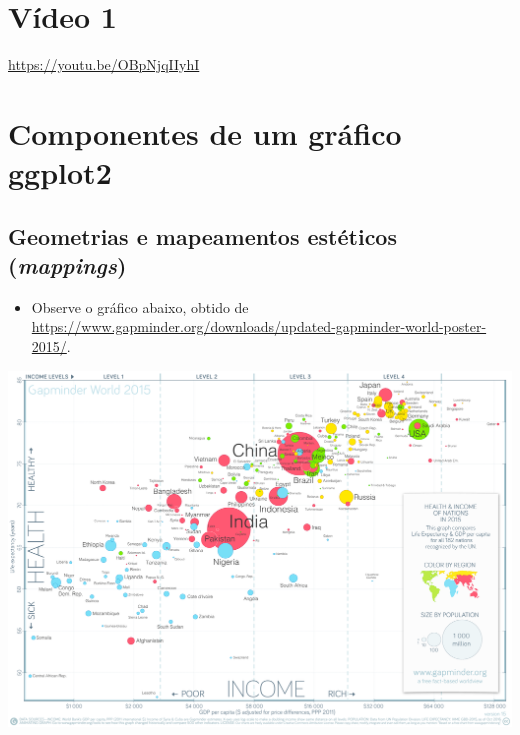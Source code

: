 \documentclass[
  11pt]{report}
\providecommand{\tightlist}{%
  \setlength{\itemsep}{0pt}\setlength{\parskip}{0pt}}
\begin{document}
\hypertarget{vuxeddeo-1-2}{%
\section{Vídeo 1}\label{vuxeddeo-1-2}}

\begin{center} \url{https://youtu.be/OBpNjqIIyhI} \end{center}

\hypertarget{componentes-de-um-gruxe1fico-ggplot2}{%
\section{Componentes de um gráfico ggplot2}\label{componentes-de-um-gruxe1fico-ggplot2}}

\hypertarget{geometrias-e-mapeamentos-estuxe9ticos-mappings}{%
\subsection{\texorpdfstring{Geometrias e mapeamentos estéticos (\emph{mappings})}{Geometrias e mapeamentos estéticos (mappings)}}\label{geometrias-e-mapeamentos-estuxe9ticos-mappings}}

\begin{itemize}
\tightlist
\item
  Observe o gráfico abaixo, obtido de \url{https://www.gapminder.org/downloads/updated-gapminder-world-poster-2015/}.
\end{itemize}

\begin{center}\includegraphics[width=1\linewidth]{images/countries-1} \end{center}
\end{document}
